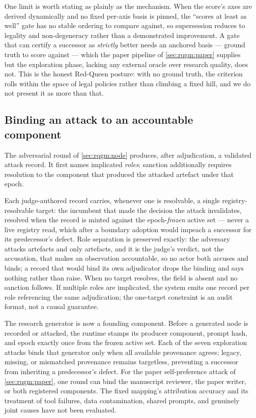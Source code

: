 One limit is worth stating as plainly as the mechanism. When the score's
axes are derived dynamically and no fixed per-axis basis is pinned, the
``scores at least as well'' gate has no stable ordering to compare
against, so supersession reduces to legality and non-degeneracy rather
than a demonstrated improvement. A gate that can certify a successor as
\emph{strictly} better needs an anchored basis --- ground truth to score
against --- which the paper pipeline of \cref{sec:rqgm:paper} supplies
but the exploration phase, lacking any external oracle over research
quality, does not. This is the honest Red-Queen posture: with no ground
truth, the criterion rolls within the space of legal policies rather than
climbing a fixed hill, and we do not present it as more than that.

\subsection{Binding an attack to an accountable component}\label{sec:rqgm:targetbinding}

The adversarial round of \cref{sec:rqgm:node} produces, after
adjudication, a validated attack record. It first names implicated
\emph{roles}; sanction additionally requires resolution to the component
that produced the attacked artefact under that epoch.

Each judge-authored record carries, whenever one is resolvable, a single
registry-resolvable target: the incumbent that made the decision
the attack invalidates, resolved when the record is minted against the
epoch-\emph{frozen} active set --- never a live registry read, which
after a boundary adoption would impeach a successor for its predecessor's
defect. Role separation is preserved exactly: the adversary attacks
artefacts and only artefacts, and it is the judge's verdict, not the
accusation, that makes an observation accountable, so no actor both
accuses and binds; a record that would bind its own adjudicator drops the
binding and says nothing rather than raise. When no target resolves, the
field is absent and no sanction follows. If multiple roles are
implicated, the system emits one record per role referencing the same
adjudication; the one-target constraint is an audit format, not a causal
guarantee.

The research generator is now a founding component. Before a generated
node is recorded or attacked, the runtime stamps its producer component,
prompt hash, and epoch exactly once from the frozen active set. Each of the
seven exploration attacks binds that generator only when all available
provenance agrees; legacy, missing, or mismatched provenance remains
targetless, preventing a successor from inheriting a predecessor's defect.
For the paper self-preference attack of \cref{sec:rqgm:paper}, one round
can bind the manuscript reviewer, the paper writer, or both registered
components. The fixed mapping's attribution accuracy and its treatment of
tool failures, data contamination, shared prompts, and genuinely joint
causes have not been evaluated.

